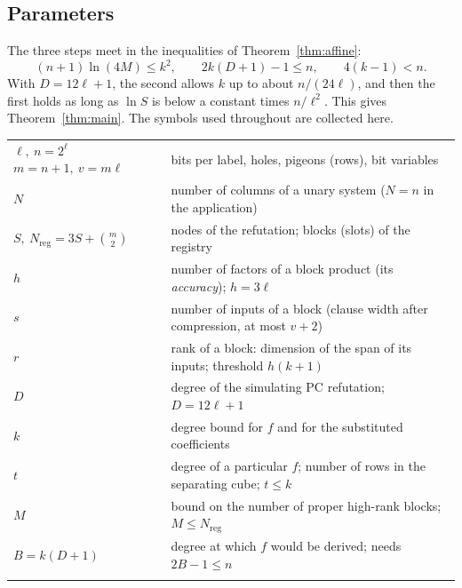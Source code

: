 \subsection{Parameters}
The three steps meet in the inequalities of Theorem~\ref{thm:affine}:
\[
 (n+1)\ln(4M)\le k^2,\qquad 2k(D+1)-1\le n,\qquad 4(k-1)<n .
\]
With \(D=12\ell+1\), the second allows \(k\) up to about \(n/(24\ell)\),
and then the first holds as long as \(\ln S\) is below a constant times
\(n/\ell^2\). This gives Theorem~\ref{thm:main}. The symbols used
throughout are collected here.
\begin{center}
\renewcommand{\arraystretch}{1.35}
\begin{tabular}{@{}>{\raggedright\arraybackslash}p{}>{\raggedright\arraybackslash}p{}@{}}
\toprule
\(\ell,\ n=2^\ell\)\newline\(m=n+1,\ v=m\ell\) & bits per label, holes, pigeons (rows), bit variables\\\addlinespace[0.2em]
\(N\) & number of columns of a unary system (\(N=n\) in the application)\\\addlinespace[0.2em]
\(S,\ N_{\mathrm{reg}}=3S+\binom m2\) & nodes of the refutation; blocks (slots) of the registry\\\addlinespace[0.2em]
\(h\) & number of factors of a block product (its \emph{accuracy}); \(h=3\ell\)\\\addlinespace[0.2em]
\(s\) & number of inputs of a block (clause width after compression, at most \(v+2\))\\\addlinespace[0.2em]
\(r\) & rank of a block: dimension of the span of its inputs; threshold \(h(k+1)\)\\\addlinespace[0.2em]
\(D\) & degree of the simulating PC refutation; \(D=12\ell+1\)\\\addlinespace[0.2em]
\(k\) & degree bound for \(f\) and for the substituted coefficients\\\addlinespace[0.2em]
\(t\) & degree of a particular \(f\); number of rows in the separating cube; \(t\le k\)\\\addlinespace[0.2em]
\(M\) & bound on the number of proper high-rank blocks; \(M\le N_{\mathrm{reg}}\)\\\addlinespace[0.2em]
\(B=k(D+1)\) & degree at which \(f\) would be derived; needs \(2B-1\le n\)\\\addlinespace[0.2em]
\bottomrule
\end{tabular}
\end{center}

